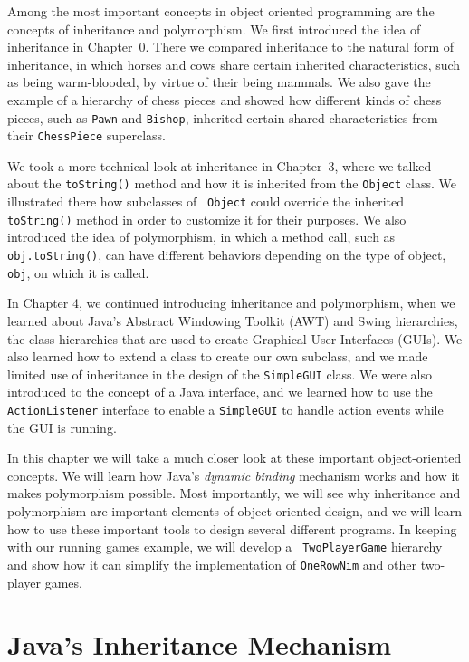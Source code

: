 Among the most important concepts in object oriented programming are
the concepts of inheritance and polymorphism.  We first introduced the
idea of inheritance in Chapter~0. There we compared inheritance to the
natural form of inheritance, in which horses and cows share certain
inherited characteristics, such as being warm-blooded, by virtue of
their being mammals. We also gave the example of a hierarchy of
chess pieces and showed how different kinds of chess pieces, such as
{\tt Pawn} and {\tt Bishop}, inherited certain shared characteristics
from their {\tt ChessPiece} superclass.

We took a more technical look at inheritance in Chapter~3, where we
talked about the {\tt toString()} method and how it is inherited from
the {\tt Object} class. We illustrated there how subclasses of {\tt
Object} could override the inherited {\tt toString()} method in order
to customize it for their purposes. We also introduced the idea of
polymorphism, in which a method call, such as {\tt obj.toString()},
can have different behaviors depending on the type of object, {\tt
obj}, on which it is called.

In Chapter 4, we continued introducing inheritance and polymorphism,
when we learned about Java's Abstract Windowing Toolkit (AWT) and
Swing hierarchies, the class hierarchies that are used to create
Graphical User Interfaces (GUIs).  We also learned how to extend a
class to create our own subclass, and we made limited use of
inheritance in the design of the {\tt SimpleGUI} class.  We were also
introduced to the concept of a Java interface, and we learned how to
use the {\tt ActionListener} interface to enable a {\tt SimpleGUI} to
handle action events while the GUI is running.

In this chapter we will take a much closer look at these important
object-oriented concepts.  We will learn how Java's {\em dynamic
binding} mechanism works and how it makes polymorphism possible.  Most
importantly, we will see why inheritance and polymorphism are
important elements of object-oriented design, and we will learn how to
use these important tools to design several different programs.  In
keeping with our running games example, we will develop a {\tt
TwoPlayerGame} hierarchy and show how it can simplify the
implementation of {\tt OneRowNim} and other two-player games.

\section{Java's Inheritance Mechanism}
\label{javas-inheritance-mechanism}

